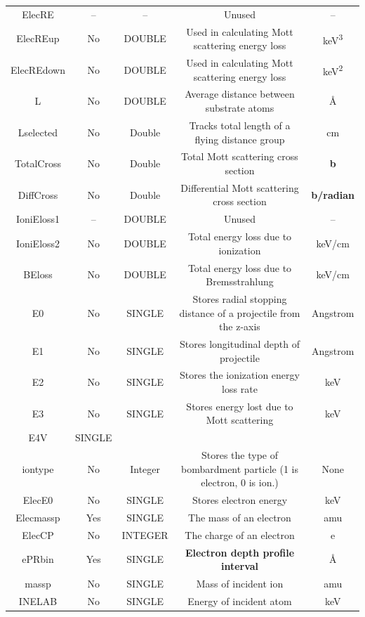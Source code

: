 \documentclass[10pt, reqno]{exam}
\begin{document}
{\begin{longtable}{|c|c|c|c|c|}
        ElecRE  & -- & --  & Unused  & --  \\
        ElecREup    & No  & DOUBLE  & Used in calculating Mott scattering energy loss  & \si{keV^3}  \\
        ElecREdown  &  No & DOUBLE  &  Used in calculating Mott scattering energy loss & \si{keV^2}  \\
        L   &  No & DOUBLE  & Average distance between substrate atoms  & \si{\angstrom}  \\
        Lselected   & No  &  Double & Tracks total length of a flying distance group  & \si{\cm}  \\
        TotalCross  & No  &  Double & Total Mott scattering cross section &  \textbf{b} \\
        DiffCross  & No & Double & Differential Mott scattering cross section &  \textbf{b/radian} \\
        IoniEloss1  &  -- & DOUBLE  &  Unused & --  \\
        IoniEloss2  & No  &  DOUBLE & Total energy loss due to ionization & keV/cm  \\
        BEloss  & No  & DOUBLE  & Total energy loss due to Bremsstrahlung  & keV/cm  \\
        E0  & No & SINGLE  & Stores radial stopping distance of a projectile from the z-axis & Angstrom \\
        E1  & No  & SINGLE  & Stores longitudinal depth of projectile & Angstrom  \\
        E2  & No & SINGLE  & Stores the ionization energy loss rate  & keV \\
        E3  & No & SINGLE  & Stores energy lost due to Mott scattering  & keV  \\
        E4V     & SINGLE  &   &   &   \\
        \hline
        iontype & No & Integer & Stores the type of bombardment particle (1 is electron, 0 is ion.) & None \\
        ElecE0 & No & SINGLE & Stores electron energy & keV \\
        Elecmassp & Yes & SINGLE & The mass of an electron & amu \\
        ElecCP & No & INTEGER & The charge of an electron & e \\
        ePRbin & Yes & SINGLE & \textbf{Electron depth profile interval} & \si{\angstrom} \\
        massp & No & SINGLE & Mass of incident ion & amu \\
        INELAB & No & SINGLE & Energy of incident atom & keV \\

\end{longtable}}
\end{document}
